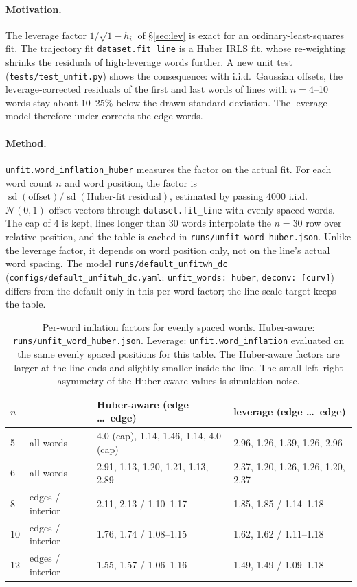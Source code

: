 \documentclass[11pt,a4paper]{article}
\newcommand{\src}[1]{{\footnotesize\texttt{#1}}}
\begin{document}
\paragraph{Motivation.} The leverage factor $1/\sqrt{1-h_i}$ of
\S\ref{sec:lev} is exact for an ordinary-least-squares fit. The trajectory
fit \texttt{dataset.fit\_line} is a Huber IRLS fit, whose re-weighting shrinks
the residuals of high-leverage words further. A new unit test
(\src{tests/test\_unfit.py}) shows the consequence: with i.i.d.\ Gaussian
offsets, the leverage-corrected residuals of the first and last words of
lines with $n=4$--10 words stay about 10--25\% below the drawn standard
deviation. The leverage model therefore under-corrects the edge words.

\paragraph{Method.} \texttt{unfit.word\_inflation\_huber} measures the factor
on the actual fit. For each word count $n$ and word position, the factor is
$\operatorname{sd}(\text{offset})/\operatorname{sd}(\text{Huber-fit
residual})$, estimated by passing 4000 i.i.d.\ $\mathcal N(0,1)$ offset
vectors through \texttt{dataset.fit\_line} with evenly spaced words. The cap
of 4 is kept, lines longer than 30 words interpolate the $n=30$ row over
relative position, and the table is cached in
\src{runs/unfit\_word\_huber.json}. Unlike the leverage factor, it depends
on word position only, not on the line's actual word spacing. The model
\texttt{runs/default\_unfitwh\_dc} (\texttt{configs/default\_unfitwh\_dc.yaml}:
\texttt{unfit\_words: huber}, \texttt{deconv: [curv]}) differs from the
default only in this per-word factor; the line-scale target keeps the table.

\begin{table}[H]\centering\small
\begin{tabular}{llll}
\toprule
$n$ & & Huber-aware (edge \ldots\ edge) & leverage (edge \ldots\ edge)\\
\midrule
5  & all words & 4.0 (cap), 1.14, 1.46, 1.14, 4.0 (cap) & 2.96, 1.26, 1.39, 1.26, 2.96\\
6  & all words & 2.91, 1.13, 1.20, 1.21, 1.13, 2.89 & 2.37, 1.20, 1.26, 1.26, 1.20, 2.37\\
8  & edges / interior & 2.11, 2.13 / 1.10--1.17 & 1.85, 1.85 / 1.14--1.18\\
10 & edges / interior & 1.76, 1.74 / 1.08--1.15 & 1.62, 1.62 / 1.11--1.18\\
12 & edges / interior & 1.55, 1.57 / 1.06--1.16 & 1.49, 1.49 / 1.09--1.18\\
\bottomrule
\end{tabular}
\caption{Per-word inflation factors for evenly spaced words. Huber-aware:
\src{runs/unfit\_word\_huber.json}. Leverage: \texttt{unfit.word\_inflation}
evaluated on the same evenly spaced positions for this table. The Huber-aware
factors are larger at the line ends and slightly smaller inside the line. The
small left--right asymmetry of the Huber-aware values is simulation noise.}
\label{tab:huberfac}
\end{table}
\end{document}
